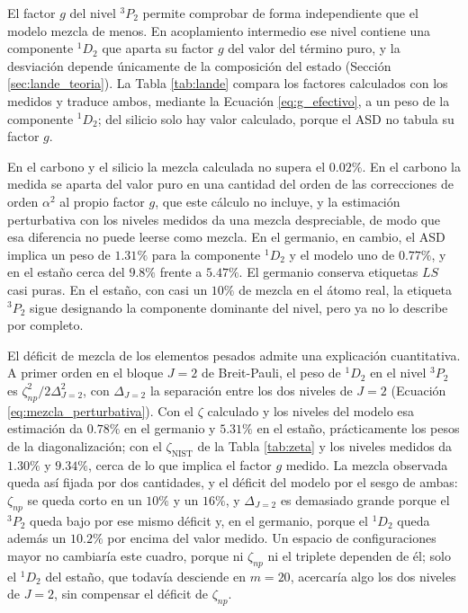 El factor $g$ del nivel $^3P_2$ permite comprobar de forma independiente que el modelo mezcla de menos. En acoplamiento intermedio ese nivel contiene una componente $^1D_2$ que aparta su factor $g$ del valor del término puro, y la desviación depende únicamente de la composición del estado (Sección \ref{sec:lande_teoria}). La Tabla \ref{tab:lande} compara los factores calculados con los medidos y traduce ambos, mediante la Ecuación \eqref{eq:g_efectivo}, a un peso de la componente $^1D_2$; del silicio solo hay valor calculado, porque el ASD no tabula su factor $g$.

\begin{table}[htbp]
    \centering
    
    \caption[Factor $g$ del nivel $^3P_2$ y peso de $^1D_2$]{Factor $g$ del nivel $^3P_2$ y peso de $^1D_2$ que implica (Ecuación \eqref{eq:g_efectivo}). Los valores calculados usan el $g_s$ real del electrón, de modo que el $^3P_2$ puro vale $1.50116$. El silicio no tiene factor $g$ tabulado en el ASD.}
    \label{tab:lande}
\end{table}

En el carbono y el silicio la mezcla calculada no supera el $0.02\%$. En el carbono la medida se aparta del valor puro en una cantidad del orden de las correcciones de orden $\alpha^2$ al propio factor $g$, que este cálculo no incluye, y la estimación perturbativa con los niveles medidos da una mezcla despreciable, de modo que esa diferencia no puede leerse como mezcla. En el germanio, en cambio, el ASD implica un peso de $1.31\%$ para la componente $^1D_2$ y el modelo uno de $0.77\%$, y en el estaño cerca del $9.8\%$ frente a $5.47\%$. El germanio conserva etiquetas $LS$ casi puras. En el estaño, con casi un $10\%$ de mezcla en el átomo real, la etiqueta $^3P_2$ sigue designando la componente dominante del nivel, pero ya no lo describe por completo.

El déficit de mezcla de los elementos pesados admite una explicación cuantitativa. A primer orden en el bloque $J=2$ de Breit-Pauli, el peso de $^1D_2$ en el nivel $^3P_2$ es $\zeta_{np}^2/2\Delta_{J=2}^2$, con $\Delta_{J=2}$ la separación entre los dos niveles de $J=2$ (Ecuación \eqref{eq:mezcla_perturbativa}). Con el $\zeta$ calculado y los niveles del modelo esa estimación da $0.78\%$ en el germanio y $5.31\%$ en el estaño, prácticamente los pesos de la diagonalización; con el $\zeta_{\text{NIST}}$ de la Tabla \ref{tab:zeta} y los niveles medidos da $1.30\%$ y $9.34\%$, cerca de lo que implica el factor $g$ medido. La mezcla observada queda así fijada por dos cantidades, y el déficit del modelo por el sesgo de ambas: $\zeta_{np}$ se queda corto en un $10\%$ y un $16\%$, y $\Delta_{J=2}$ es demasiado grande porque el $^3P_2$ queda bajo por ese mismo déficit y, en el germanio, porque el $^1D_2$ queda además un $10.2\%$ por encima del valor medido. Un espacio de configuraciones mayor no cambiaría este cuadro, porque ni $\zeta_{np}$ ni el triplete dependen de él; solo el $^1D_2$ del estaño, que todavía desciende en $m=20$, acercaría algo los dos niveles de $J=2$, sin compensar el déficit de $\zeta_{np}$.

